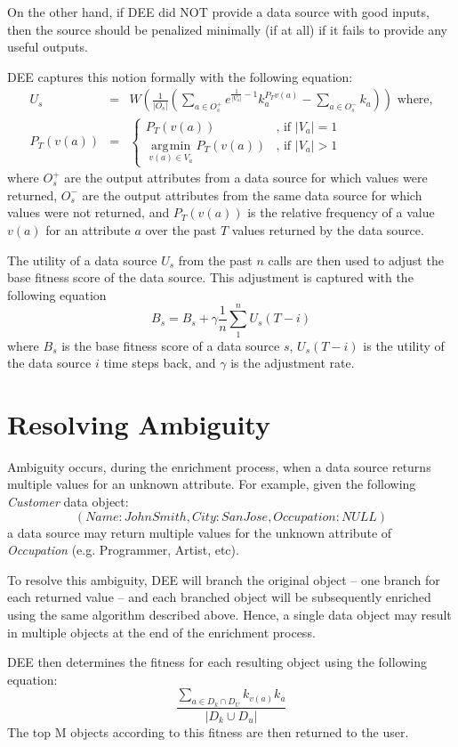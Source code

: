 \documentclass{article}
\DeclareMathOperator*{\argmin}{\arg\!\min}
\begin{document}
On the other hand, if DEE did NOT provide a data source with good inputs, then the source should
be penalized minimally (if at all) if it fails to provide any useful outputs.

DEE captures this notion formally with the following equation:
\begin{eqnarray}
U_s &=& W \left( \frac{1}{|O_s|} \left( \displaystyle\sum\limits_{a \in O_s^+} e^{\frac{1}{|V_a|} - 1}k_a^{P_Tv(a)} - \displaystyle\sum\limits_{a \in O_s^-}k_a \right) \right) \nonumber \mbox{ where,}\\
P_T(v(a)) &=& \left\lbrace \begin{array}{ll} P_T (v(a)) & \mbox{, if } |V_a|= 1 \\ \argmin\limits_{v(a) \in V_a} P_T(v(a)) & \mbox{, if } |V_a| > 1 \end{array} \right.
\end{eqnarray}
where $O_s^+$ are the output attributes from a data source for which values were returned, $O_s^-$ 
are the output attributes from the same data source for which values were not returned, and $P_T(v(a))$
is the relative frequency of a value $v(a)$ for an attribute $a$ over the past $T$ values returned 
by the data source. 

The utility of a data source $U_s$ from the past $n$ calls are then used to adjust the base fitness score 
of the data source. This adjustment is captured with the following equation
\begin{equation}
 B_s= B_s + \gamma \frac{1}{n} \displaystyle\sum\limits_{1}^{n}U_s(T - i)
\end{equation}
where $B_s$ is the base fitness score of a data source $s$, $U_s(T-i)$ is the utility of the data source $i$ time steps
back, and $\gamma$ is the adjustment rate.


\section{Resolving Ambiguity}

Ambiguity occurs, during the enrichment process, when a data source returns multiple values for an unknown 
attribute. For example, given the following {\it Customer} data object:
\begin{equation}
	(Name: John Smith, City: San Jose, Occupation: NULL)
\end{equation}
a data source may return multiple values for the unknown attribute of {\it Occupation} (e.g. Programmer, 
Artist, etc).

To resolve this ambiguity, DEE will branch the original object -- one branch for each returned value -- 
and each branched object will be subsequently enriched using the same algorithm described above. Hence, 
a single data object may result in multiple objects at the end of the enrichment process. 

DEE then determines the fitness for each resulting object using the following equation:
\begin{equation}
	\frac{\displaystyle\sum\limits_{a \in D_k \cap D_U} k_{v(a)} k_a }{|D_k \cup D_u|}
\end{equation}
The top M objects according to this fitness are then returned to the user.
\end{document}
